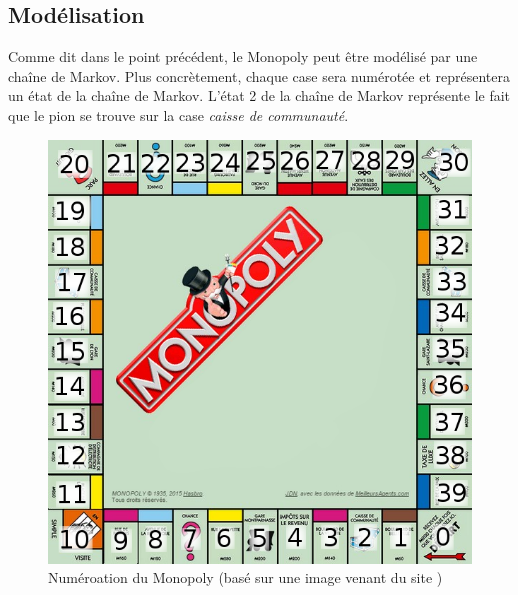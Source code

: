 \documentclass[letterpaper]{article}
\begin{document}
  \subsection{Modélisation}
    Comme dit dans le point précédent, le Monopoly peut être modélisé par une chaîne de
    Markov.  Plus concrètement, chaque case sera numérotée et représentera un état de 
    la chaîne de Markov.  L'état 2 de la chaîne de Markov représente le fait que le
    pion se trouve sur la case \textit{caisse de communauté}.
    \begin{figure}[h]
      \centering
      \includegraphics[scale=0.4]{./Images/Monopoly.png}
	\caption{Numéroation du Monopoly (basé sur une image venant du site 
	\cite{IMG_Monopoly})}
    \end{figure}
    
\end{document}
